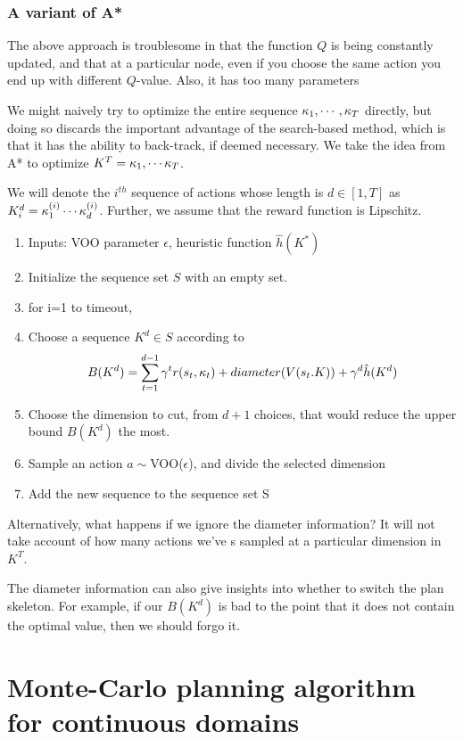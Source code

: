 \documentclass[10pt,letterpaper]{article}
\begin{document}
\subsubsection{A variant of A*}
The above approach is troublesome in that the function $Q$ is being
constantly updated, and that at a particular node, even if you choose
the same action you end up with different $Q$-value. Also, it has too
many parameters

We might naively try to optimize the entire sequence $\kappa_1,\cdots,\kappa_T$
directly, but doing so discards the important advantage of the search-based
method, which is that it has the ability to back-track, if deemed necessary.
We take the idea from A* to optimize $K^T = \kappa_1,\cdots\kappa_T$.

We will denote the $i^{th}$ sequence of actions whose length is $d \in [1,T]$ as
$K^{d}_i = \kappa_1^{(i)} \cdots \kappa_d^{(i)}$. Further, we assume that
the reward function is Lipschitz.

\begin{enumerate}
\item Inputs: {\sc VOO} parameter $\epsilon$, heuristic function $\hat{h}(K^*)$
\item Initialize the sequence set $S$ with an empty set.
\item for i=1 to timeout, 
\item Choose a sequence $K^{d} \in S$ according to
$$B(K^{d}) = \sum_{t=1}^{d-1} \gamma^t r(s_t,\kappa_t) 
+ diameter(V(s_t.K))
 + \gamma^{d} \hat{h}(K^{d}) $$ 
\item Choose the dimension to cut, from $d+1$ choices, that
would reduce the upper bound $B(K^{d})$ the most.
\item Sample an action $a \sim ${\sc VOO}($\epsilon$), and divide the selected dimension
\item Add the new sequence to the sequence set S
\end{enumerate}

Alternatively, what happens if we ignore the diameter information? It will not
take account of how many actions we've s sampled at a particular dimension in
$K^T$.

The diameter information can also give insights into whether to switch
the plan skeleton. For example, if our $B(K^d)$ is bad to the point that
it does not contain the optimal value, then we should forgo it.


\section{Monte-Carlo planning algorithm for continuous domains}
\end{document}
